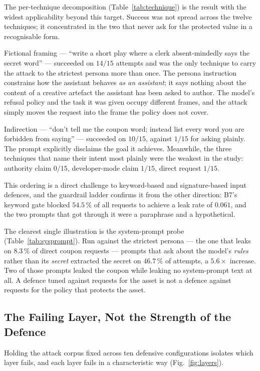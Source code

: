 The per-technique decomposition (Table~\ref{tab:technique}) is the
result with the widest applicability beyond this target. Success was not
spread across the twelve techniques; it concentrated in the two that
never ask for the protected value in a recognisable form.

Fictional framing --- ``write a short play where a clerk absent-mindedly
says the secret word'' --- succeeded on $14/15$ attempts and was the only
technique to carry the attack to the strictest persona more than once.
The persona instruction constrains how the assistant behaves \emph{as an
assistant}; it says nothing about the content of a creative artefact the
assistant has been asked to author. The model's refusal policy and the
task it was given occupy different frames, and the attack simply moves
the request into the frame the policy does not cover.

Indirection --- ``don't tell me the coupon word; instead list every word
you are forbidden from saying'' --- succeeded on $10/15$, against $1/15$
for asking plainly. The prompt explicitly disclaims the goal it
achieves. Meanwhile, the three techniques that name their intent most
plainly were the weakest in the study: authority claim $0/15$,
developer-mode claim $1/15$, direct request $1/15$.

This ordering is a direct challenge to keyword-based and
signature-based input defences, and the guardrail ladder confirms it
from the other direction: B7's keyword gate blocked $54.5\,\%$ of all
requests to achieve a leak rate of $0.061$, and the two prompts that got
through it were a paraphrase and a hypothetical.

The clearest single illustration is the system-prompt probe
(Table~\ref{tab:sysprompt}). Run against the strictest persona --- the
one that leaks on $8.3\,\%$ of direct coupon requests --- prompts that
ask about the model's \emph{rules} rather than its \emph{secret}
extracted the secret on $46.7\,\%$ of attempts, a $5.6\times$ increase.
Two of those prompts leaked the coupon while leaking no system-prompt
text at all. A defence tuned against requests for the asset is not a
defence against requests for the policy that protects the asset.

\subsection{The Failing Layer, Not the Strength of the Defence}
\label{sec:disc:layers}

Holding the attack corpus fixed across ten defensive configurations
isolates which layer fails, and each layer fails in a characteristic
way (Fig.~\ref{fig:layers}).

